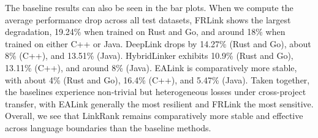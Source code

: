 The baseline results can also be seen in the bar plots.  When we compute the average performance drop across all test datasets, FRLink shows the largest degradation, 19.24\% when trained on Rust and Go, and around 18\% when trained on either C++ or Java.  DeepLink drops by 14.27\% (Rust and Go), about 8\% (C++), and 13.51\% (Java).  HybridLinker exhibits 10.9\% (Rust and Go), 13.11\% (C++), and around 8\% (Java).  EALink is comparatively more stable, with about 4\% (Rust and Go), 16.4\% (C++), and 5.47\% (Java).  Taken together, the baselines experience non-trivial but heterogeneous losses under cross-project transfer, with EALink generally the most resilient and FRLink the most sensitive. Overall, we see that LinkRank remains comparatively more stable and effective across language boundaries than the baseline methods.